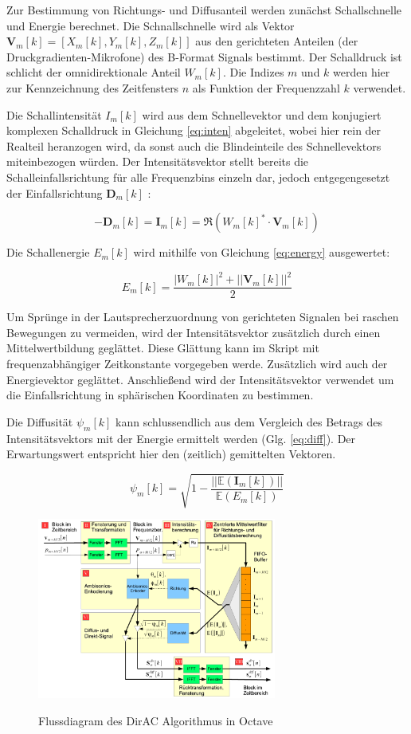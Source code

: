Zur Bestimmung von Richtungs- und Diffusanteil werden zunächst Schallschnelle und Energie berechnet. Die Schnallschnelle wird als Vektor $\textbf{V}_{m}[k] = [X_{m}[k], Y_{m}[k], Z_{m}[k]]$ aus den gerichteten Anteilen (der Druckgradienten-Mikrofone) des B-Format Signals bestimmt. Der Schalldruck ist schlicht der omnidirektionale Anteil $W_{m}[k]$. Die Indizes $m$ und $k$ werden hier zur Kennzeichnung des Zeitfensters $n$ als Funktion der Frequenzzahl $k$ verwendet.

Die Schallintensität $I_{m}[k]$ wird aus dem Schnellevektor und dem konjugiert komplexen Schalldruck in Gleichung \ref{eq:inten} abgeleitet, wobei hier rein der Realteil heranzogen wird, da sonst auch die Blindeinteile des Schnellevektors miteinbezogen würden. Der Intensitätsvektor stellt bereits die Schalleinfallsrichtung für alle Frequenzbins einzeln dar, jedoch entgegengesetzt der Einfallsrichtung $\textbf{D}_{m}[k]$ :

\begin{equation}
    -\textbf{D}_{m}[k] = \textbf{I}_{m}[k] = \Re(W_{m}[k]^{*} \cdot \textbf{V}_{m}[k])
    \label{eq:inten}
\end{equation}

Die Schallenergie $E_{m}[k]$ wird mithilfe von Gleichung \ref{eq:energy} ausgewertet:

\begin{equation}
    E_{m}[k] = \frac{|W_{m}[k]|^2+||\textbf{V}_{m}[k]||^2}{2}
    \label{eq:energy}
\end{equation}

Um Sprünge in der Lautsprecherzuordnung von gerichteten Signalen bei raschen Bewegungen zu vermeiden, wird der Intensitätsvektor zusätzlich durch einen Mittelwertbildung geglättet. Diese Glättung kann im Skript mit frequenzabhängiger Zeitkonstante vorgegeben werde. Zusätzlich wird auch der Energievektor geglättet. Anschließend wird der Intensitätsvektor verwendet um die Einfallsrichtung in sphärischen Koordinaten zu bestimmen.

Die Diffusität $\psi_{m}[k]$ kann schlussendlich aus dem Vergleich des Betrags des Intensitätsvektors mit der Energie ermittelt werden (Glg. \ref{eq:diff}). Der Erwartungswert entspricht hier den (zeitlich) gemittelten Vektoren.

\begin{equation}
    \psi_{m}[k] = \sqrt{1 - \frac{||\mathbb{E}(\textbf{I}_{m}[k])||}{\mathbb{E}(E_{m}[k])}}
    \label{eq:diff}
\end{equation}

\begin{figure}[!ht]
  \centering
  \includegraphics[width=0.7\textwidth]{implementierung/plots/flow.png}
  \label{fig:flow}
  \caption{Flussdiagram des DirAC Algorithmus in Octave}
\end{figure}
